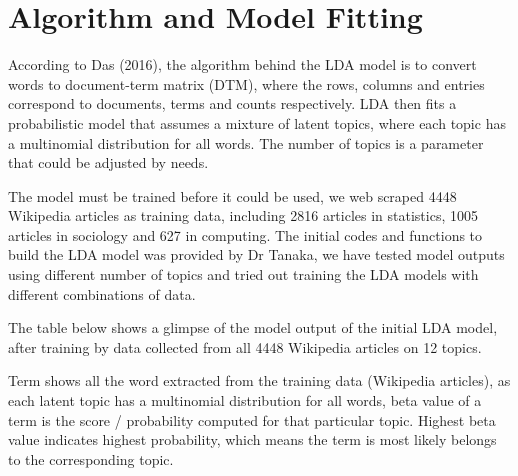 \documentclass[
  letterpaper,
]{report}
\begin{document}
\hypertarget{sec-model}{%
\section*{Algorithm and Model Fitting}\label{sec-model}}

According to Das (2016), the algorithm behind the LDA model is to
convert words to document-term matrix (DTM), where the rows, columns and
entries correspond to documents, terms and counts respectively. LDA then
fits a probabilistic model that assumes a mixture of latent topics,
where each topic has a multinomial distribution for all words. The
number of topics is a parameter that could be adjusted by needs.

The model must be trained before it could be used, we web scraped 4448
Wikipedia articles as training data, including 2816 articles in
statistics, 1005 articles in sociology and 627 in computing. The initial
codes and functions to build the LDA model was provided by Dr Tanaka, we
have tested model outputs using different number of topics and tried out
training the LDA models with different combinations of data.

The table below shows a glimpse of the model output of the initial LDA
model, after training by data collected from all 4448 Wikipedia articles
on 12 topics.

\begin{table}
\centering
{}
\end{table}

Term shows all the word extracted from the training data (Wikipedia
articles), as each latent topic has a multinomial distribution for all
words, beta value of a term is the score / probability computed for that
particular topic. Highest beta value indicates highest probability,
which means the term is most likely belongs to the corresponding topic.
\end{document}
